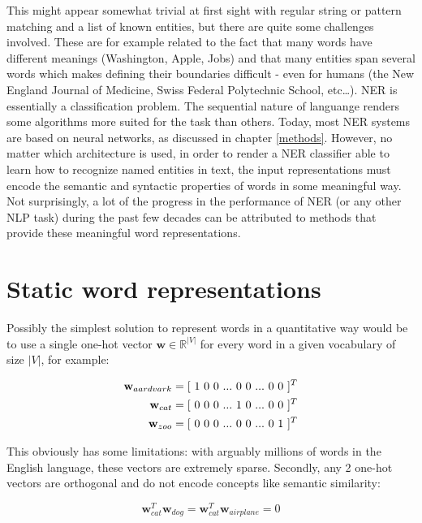 \documentclass[12pt,a4paper,]{book}
\begin{document}
This might appear somewhat trivial at first sight with regular string or pattern matching and a list of known entities, but there are quite some challenges involved. These are for example related to the fact that many words have different meanings (Washington, Apple, Jobs) and that many entities span several words which makes defining their boundaries difficult - even for humans (the New England Journal of Medicine, Swiss Federal Polytechnic School, etc\ldots{}). NER is essentially a classification problem. The sequential nature of languange renders some algorithms more suited for the task than others. Today, most NER systems are based on neural networks, as discussed in chapter \ref{methods}. However, no matter which architecture is used, in order to render a NER classifier able to learn how to recognize named entities in text, the input representations must encode the semantic and syntactic properties of words in some meaningful way. Not surprisingly, a lot of the progress in the performance of NER (or any other NLP task) during the past few decades can be attributed to methods that provide these meaningful word representations.

\hypertarget{static-word-representations}{%
\section{Static word representations}\label{static-word-representations}}

Possibly the simplest solution to represent words in a quantitative way would be to use a single one-hot vector \(\mathbf{w} \in \mathbb{R}^{|V|}\) for every word in a given vocabulary of size \(|V|\), for example:

\begin{align}
\mathbf{w}_{aardvark} = [\ 1\ 0\ 0\ ...\ 0\ 0\ ...\ 0\ 0\ ]^T \notag \\
\mathbf{w}_{cat} = [\ 0\ 0\ 0\ ...\ 1\ 0\ ...\ 0\ 0\ ]^T \notag \\
\mathbf{w}_{zoo} = [\ 0\ 0\ 0\ ...\ 0\ 0\ ...\ 0\ 1\ ]^T \notag 
\end{align}

This obviously has some limitations: with arguably millions of words in the English language, these vectors are extremely sparse. Secondly, any 2 one-hot vectors are orthogonal and do not encode concepts like semantic similarity:

\[
\mathbf{w}_{cat}^T \mathbf{w}_{dog} = \mathbf{w}_{cat}^T \mathbf{w}_{airplane} = 0
\]
\end{document}
